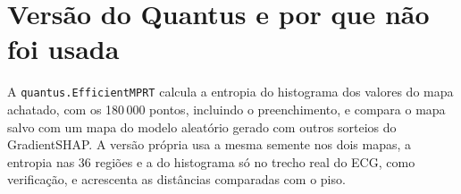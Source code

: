 \documentclass[11pt,a4paper]{article}
\begin{document}
\section{Versão do Quantus e por que não foi usada}
A \texttt{quantus.EfficientMPRT} calcula a entropia do histograma dos valores do mapa achatado, com os 180\,000 pontos, incluindo o preenchimento, e compara o mapa salvo com um mapa do modelo aleatório gerado com outros sorteios do GradientSHAP. A versão própria usa a mesma semente nos dois mapas, a entropia nas 36 regiões e a do histograma só no trecho real do ECG, como verificação, e acrescenta as distâncias comparadas com o piso.
\end{document}
